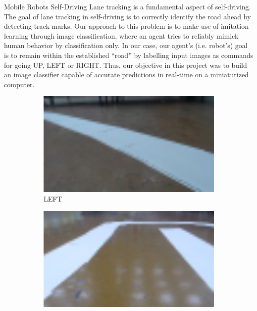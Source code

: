 \documentclass[final,hyperref={pdfpagelabels=false},notheorems]{beamer}
\theoremstyle{thesisstyle}
\newcommand{\pskip}{\vskip 0.5cm}
\begin{document}
\begin{frame}[t]
\begin{columns}[t]
\begin{column}{.5\textwidth}
    \begin{block}{Mobile Robots Self-Driving}
      Lane tracking is a fundamental aspect of self-driving. The goal of lane tracking in
      self-driving is to correctly identify the road ahead by detecting track marks. Our approach
      to this problem is to make use of imitation learning through image classification, where an
      agent tries to reliably mimick human behavior by classification only. In our case, our
      agent's (i.e. robot's) goal is to remain within the established ``road'' by labelling input
      images as commands for going UP, LEFT or RIGHT. Thus, our objective in this project was to
      build an image classifier capable of accurate predictions in real-time on a miniaturized
      computer.\pskip

      \begin{figure}
        \begin{subfigure}{0.3\linewidth}
          \centering\includegraphics[width=1.0\textwidth]{imgs/sample_left.png}
          \captionsetup{justification=centering}
          \caption*{LEFT}
        \end{subfigure}
        \begin{subfigure}{0.3\linewidth}
          \centering\includegraphics[width=1.0\textwidth]{imgs/sample_up.png}

\end{subfigure}
\end{figure}
\end{block}
\end{column}
\end{columns}
\end{frame}
\end{document}
